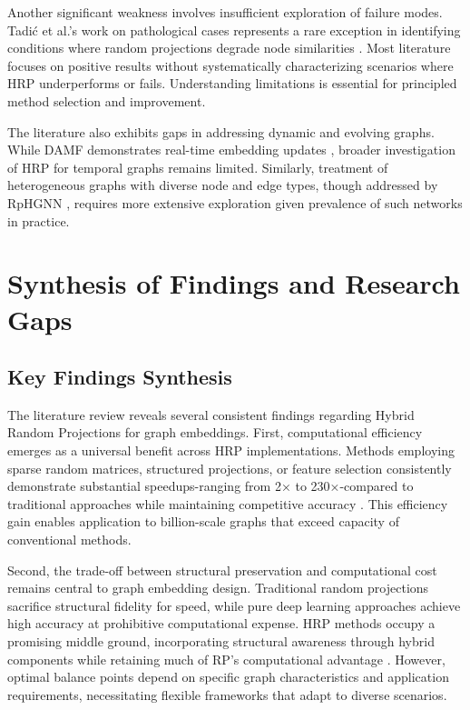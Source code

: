 \documentclass[conference]{IEEEtran}
\begin{document}
Another significant weakness involves insufficient exploration of failure modes. Tadić et al.'s work on pathological cases represents a rare exception in identifying conditions where random projections degrade node similarities \cite{tadic2024}. Most literature focuses on positive results without systematically characterizing scenarios where HRP underperforms or fails. Understanding limitations is essential for principled method selection and improvement.

The literature also exhibits gaps in addressing dynamic and evolving graphs. While DAMF demonstrates real-time embedding updates \cite{deng2023damf}, broader investigation of HRP for temporal graphs remains limited. Similarly, treatment of heterogeneous graphs with diverse node and edge types, though addressed by RpHGNN \cite{hu2021rphgnn}, requires more extensive exploration given prevalence of such networks in practice.

\section{Synthesis of Findings and Research Gaps}

\subsection{Key Findings Synthesis}

The literature review reveals several consistent findings regarding Hybrid Random Projections for graph embeddings. First, computational efficiency emerges as a universal benefit across HRP implementations. Methods employing sparse random matrices, structured projections, or feature selection consistently demonstrate substantial speedups-ranging from 2× to 230×-compared to traditional approaches while maintaining competitive accuracy \cite{hu2021rphgnn, bui2023rap, xie2023sketchne}. This efficiency gain enables application to billion-scale graphs that exceed capacity of conventional methods.

Second, the trade-off between structural preservation and computational cost remains central to graph embedding design. Traditional random projections sacrifice structural fidelity for speed, while pure deep learning approaches achieve high accuracy at prohibitive computational expense. HRP methods occupy a promising middle ground, incorporating structural awareness through hybrid components while retaining much of RP's computational advantage \cite{yahaya2025hrp}. However, optimal balance points depend on specific graph characteristics and application requirements, necessitating flexible frameworks that adapt to diverse scenarios.
\end{document}
